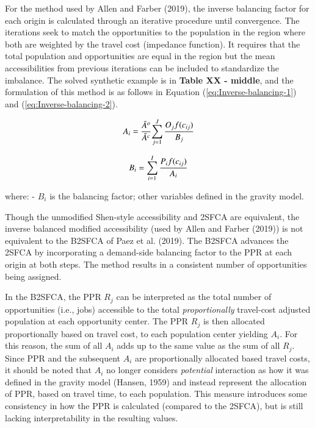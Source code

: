 \documentclass[]{elsarticle} %
\begin{document}
For the method used by Allen and Farber (2019), the inverse balancing
factor for each origin is calculated through an iterative procedure
until convergence. The iterations seek to match the opportunities to the
population in the region where both are weighted by the travel cost
(impedance function). It requires that the total population and
opportunities are equal in the region but the mean accessibilities from
previous iterations can be included to standardize the imbalance. The
solved synthetic example is in \textbf{Table XX - middle}, and the
formulation of this method is as follows in Equation
(\ref{eq:Inverse-balancing-1}) and (\ref{eq:Inverse-balancing-2}).

\begin{equation}
\label{eq:Inverse-balancing-1}
A_{i} = \frac{\bar A^{o}}{\bar A^{c}}{\sum_{j=1}^{J} \frac{O_{j}f(c_{ij})}{B_{j}}}\\
\end{equation}

\begin{equation}
\label{eq:Inverse-balancing-2}
B_{i} = {\sum_{i=1}^{I} \frac{P_{i}f(c_{ij})}{A_{i}}}\\
\end{equation}

\noindent where: - \(B_{i}\) is the balancing factor; other variables
defined in the gravity model.

Though the unmodified Shen-style accessibility and 2SFCA are equivalent,
the inverse balanced modified accessibility (used by Allen and Farber
(2019)) is not equivalent to the B2SFCA of Paez et al. (2019). The
B2SFCA advances the 2SFCA by incorporating a demand-side balancing
factor to the PPR at each origin at both steps. The method results in a
consistent number of opportunities being assigned.

In the B2SFCA, the PPR \(R_{j}\) can be interpreted as the total number
of opportunities (i.e., jobs) accessible to the total
\emph{proportionally} travel-cost adjusted population at each
opportunity center. The PPR \(R_{j}\) is then allocated proportionally
based on travel cost, to each population center yielding \(A_{i}\). For
this reason, the sum of all \(A_{i}\) adds up to the same value as the
sum of all \(R_{j}\). Since PPR and the subsequent \(A_{i}\) are
proportionally allocated based travel costs, it should be noted that
\(A_{i}\) no longer considers \emph{potential} interaction as how it was
defined in the gravity model (Hansen, 1959) and instead represent the
allocation of PPR, based on travel time, to each population. This
measure introduces some consistency in how the PPR is calculated
(compared to the 2SFCA), but is still lacking interpretability in the
resulting values.
\end{document}
